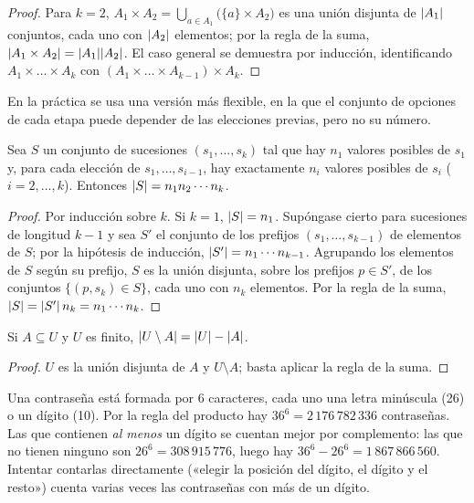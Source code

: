 \begin{proof}
Para $k=2$, $A_1\times A_2=\bigcup_{a\in A_1}\bigl(\{a\}\times A_2\bigr)$ es una unión disjunta de $\lvert A_1\rvert$ conjuntos, cada uno con $\lvert A_2\rvert$ elementos; por la regla de la suma, $\lvert A_1\times A_2\rvert=\lvert A_1\rvert\lvert A_2\rvert$. El caso general se demuestra por inducción, identificando $A_1\times\dots\times A_k$ con $(A_1\times\dots\times A_{k-1})\times A_k$.
\end{proof}

En la práctica se usa una versión más flexible, en la que el conjunto de opciones de cada etapa puede depender de las elecciones previas, pero no su número.

\begin{teorema}\label{teo:t1-producto-gen}
Sea $S$ un conjunto de sucesiones $(s_1,\dots,s_k)$ tal que hay $n_1$ valores posibles de $s_1$ y, para cada elección de $s_1,\dots,s_{i-1}$, hay exactamente $n_i$ valores posibles de $s_i$ ($i=2,\dots,k$). Entonces $\lvert S\rvert=n_1n_2\cdots n_k$.
\end{teorema}

\begin{proof}
Por inducción sobre $k$. Si $k=1$, $\lvert S\rvert=n_1$. Supóngase cierto para sucesiones de longitud $k-1$ y sea $S'$ el conjunto de los prefijos $(s_1,\dots,s_{k-1})$ de elementos de $S$; por la hipótesis de inducción, $\lvert S'\rvert=n_1\cdots n_{k-1}$. Agrupando los elementos de $S$ según su prefijo, $S$ es la unión disjunta, sobre los prefijos $p\in S'$, de los conjuntos $\{(p,s_k)\in S\}$, cada uno con $n_k$ elementos. Por la regla de la suma, $\lvert S\rvert=\lvert S'\rvert\,n_k=n_1\cdots n_k$.
\end{proof}

\begin{proposicion}\label{prop:t1-complemento}
Si $A\subseteq U$ y $U$ es finito, $\lvert U\setminus A\rvert=\lvert U\rvert-\lvert A\rvert$.
\end{proposicion}

\begin{proof}
$U$ es la unión disjunta de $A$ y $U\setminus A$; basta aplicar la regla de la suma.
\end{proof}

\begin{ejemplo}[Contraseñas]\label{ej:t1-contrasenas}
Una contraseña está formada por 6 caracteres, cada uno una letra minúscula (26) o un dígito (10). Por la regla del producto hay $36^{6}=2\,176\,782\,336$ contraseñas. Las que contienen \emph{al menos} un dígito se cuentan mejor por complemento: las que no tienen ninguno son $26^{6}=308\,915\,776$, luego hay $36^{6}-26^{6}=1\,867\,866\,560$. Intentar contarlas directamente («elegir la posición del dígito, el dígito y el resto») cuenta varias veces las contraseñas con más de un dígito.
\end{ejemplo}

